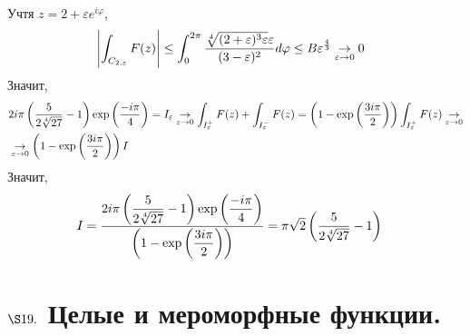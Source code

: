 Учтя $z = 2 + \varepsilon e^{i \varphi}$,
\begin{align*}
  & \left|  \int_{C_{2, \varepsilon}}F(z) \right| \leq \int_{0}^{2 \pi}\frac{\sqrt[4]{(2+\varepsilon)^3\varepsilon}\varepsilon}{(3-\varepsilon)^2}d\varphi \leq B\varepsilon^{\frac{4}{3}} \underset{\varepsilon \to 0}{\to} 0
\end{align*}
Значит,
\begin{align*}
  & 2 i \pi \left( \frac{5}{2\sqrt[4]{27}} - 1 \right)\exp\left( \frac{-i\pi}{4} \right) = I_\varepsilon \underset{\varepsilon \to 0}{\to} \int_{I_\varepsilon^+}F(z) + \int_{I_\varepsilon^-}F(z) = \left( 1 -\exp\left( \frac{3i\pi}{2}\right) \right) \int_{I_\varepsilon^+}F(z) \underset{\varepsilon \to 0}{\to} \\
  & \underset{\varepsilon \to 0}{\to} \left( 1 -\exp\left( \frac{3i\pi}{2}\right) \right) I
\end{align*}
Значит,
\begin{align*}
  & I = \frac{2 i \pi \left( \displaystyle \frac{5}{2\sqrt[4]{27}} - 1 \right)\exp\left( \displaystyle\frac{-i\pi}{4} \right)}{\left( 1 -\exp\left( \displaystyle \frac{3i\pi}{2}\right) \right)}= \pi \sqrt{2}\left( \displaystyle \frac{5}{2\sqrt[4]{27}} - 1 \right)
\end{align*}
\section{$\S 19.$ Целые и мероморфные функции.}

